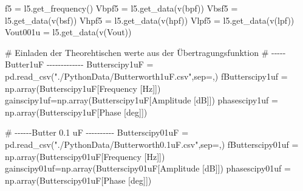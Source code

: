 \documentclass[
  ngerman,
  letterpaper,
  DIV=11]{scrreprt}
\newenvironment{Shaded}{}{}
\newcommand{\CommentTok}[1]{\textcolor[rgb]{0.42,0.45,0.49}{#1}}
\newcommand{\NormalTok}[1]{\textcolor[rgb]{0.14,0.16,0.18}{#1}}
\newcommand{\OperatorTok}[1]{\textcolor[rgb]{0.14,0.16,0.18}{#1}}
\newcommand{\StringTok}[1]{\textcolor[rgb]{0.01,0.18,0.38}{#1}}
\begin{document}
\begin{Shaded}
\begin{Highlighting}[]
\NormalTok{f5 }\OperatorTok{=}\NormalTok{ l5.get\_frequency()}
\NormalTok{Vbpf5 }\OperatorTok{=}\NormalTok{ l5.get\_data(}\StringTok{\textquotesingle{}v(bpf)\textquotesingle{}}\NormalTok{)}
\NormalTok{Vbsf5 }\OperatorTok{=}\NormalTok{ l5.get\_data(}\StringTok{\textquotesingle{}v(bsf)\textquotesingle{}}\NormalTok{)}
\NormalTok{Vhpf5 }\OperatorTok{=}\NormalTok{ l5.get\_data(}\StringTok{\textquotesingle{}v(hpf)\textquotesingle{}}\NormalTok{)}
\NormalTok{Vlpf5 }\OperatorTok{=}\NormalTok{ l5.get\_data(}\StringTok{\textquotesingle{}v(lpf)\textquotesingle{}}\NormalTok{)}
\NormalTok{Vout001u  }\OperatorTok{=}\NormalTok{ l5.get\_data(}\StringTok{\textquotesingle{}v(Vout)\textquotesingle{}}\NormalTok{) }
\end{Highlighting}
\end{Shaded}

\begin{Shaded}
\begin{Highlighting}[]
\CommentTok{\# Einladen der Theorehtischen werte aus der Übertragungsfunktion}
\CommentTok{\# {-}{-}{-}{-}{-} Butter1uF {-}{-}{-}{-}{-}{-}{-}{-}{-}{-}{-}{-}{-} }
\NormalTok{Butterscipy1uF }\OperatorTok{=}\NormalTok{ pd.read\_csv(}\StringTok{"./PythonData/Butterworth1uF.csv"}\NormalTok{,sep}\OperatorTok{=}\StringTok{\textquotesingle{},\textquotesingle{}}\NormalTok{)}
\NormalTok{fButterscipy1uf }\OperatorTok{=}\NormalTok{ np.array(Butterscipy1uF[}\StringTok{\textquotesingle{}Frequency [Hz]\textquotesingle{}}\NormalTok{])}
\NormalTok{gainscipy1uf}\OperatorTok{=}\NormalTok{np.array(Butterscipy1uF[}\StringTok{\textquotesingle{}Amplitude [dB]\textquotesingle{}}\NormalTok{])}
\NormalTok{phasescipy1uf }\OperatorTok{=}\NormalTok{ np.array(Butterscipy1uF[}\StringTok{\textquotesingle{}Phase [deg]\textquotesingle{}}\NormalTok{])}

\CommentTok{\# {-}{-}{-}{-}{-}{-}Butter 0.1 uF {-}{-}{-}{-}{-}{-}{-}{-}{-}{-} }
\NormalTok{Butterscipy01uF }\OperatorTok{=}\NormalTok{ pd.read\_csv(}\StringTok{"./PythonData/Butterworth0.1uF.csv"}\NormalTok{,sep}\OperatorTok{=}\StringTok{\textquotesingle{},\textquotesingle{}}\NormalTok{)}
\NormalTok{fButterscipy01uf }\OperatorTok{=}\NormalTok{ np.array(Butterscipy01uF[}\StringTok{\textquotesingle{}Frequency [Hz]\textquotesingle{}}\NormalTok{])}
\NormalTok{gainscipy01uf}\OperatorTok{=}\NormalTok{np.array(Butterscipy01uF[}\StringTok{\textquotesingle{}Amplitude [dB]\textquotesingle{}}\NormalTok{])}
\NormalTok{phasescipy01uf }\OperatorTok{=}\NormalTok{ np.array(Butterscipy01uF[}\StringTok{\textquotesingle{}Phase [deg]\textquotesingle{}}\NormalTok{])}


\end{Highlighting}
\end{Shaded}
\end{document}
